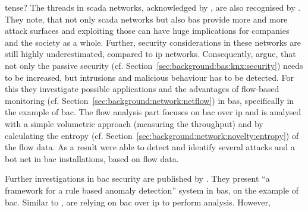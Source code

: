 \alert{tense?}
The threads in \gls{scada} networks, acknowledged by \textcite{Yang2006}, are also recognised by \textcite{Celeda2012}. They note, that not only \gls{scada} networks but also \gls{bas} provide more and more attack surfaces and exploiting those can have huge implications for companies and the society as a whole.
Further, security considerations in these networks are still highly underestimated, compared to \gls{ip} networks.
Consequently, \textcite{Celeda2012} argue, that not only the passive security (cf. Section~\ref{sec:background:bas:knx:security}) needs to be increased, but intrusions and malicious behaviour has to be detected. For this they investigate possible applications and the advantages of flow-based monitoring (cf. Section~\ref{sec:background:network:netflow}) in \gls{bas}, specifically in the example of \gls{bac}.
The flow analysis part focuses on \gls{bac} over \gls{ip} and is analysed with a simple volumetric approach (measuring the throughput) and by calculating the entropy (cf. Section~\ref{sec:background:network:novelty:entropy}) of the flow data.
As a result \textcite{Celeda2012} were able to detect and identify several attacks and a bot net in \gls{bac} installations, based on flow data.

Further investigations in \gls{bac} security are published by \textcite{Pan2014}. They present \enquote{a framework for a rule based anomaly detection} system in \gls{bas}, on the example of \gls{bac}.
Similar to \textcite{Yang2006}, \textcite{Pan2014} are relying on \gls{bac} over \gls{ip} to perform analysis.
However, 


